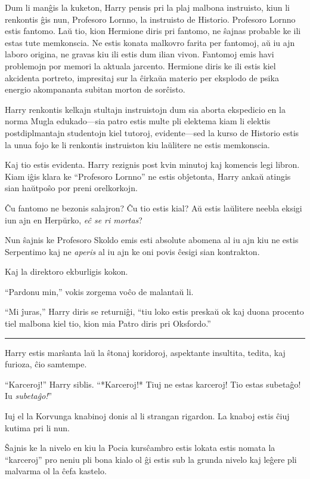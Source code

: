 Dum li manĝis la kuketon, Harry pensis pri la plaj malbona instruisto,
kiun li renkontis ĝis nun, Profesoro Lornno, la instruisto de
Historio. Profesoro Lornno estis fantomo. Laŭ tio, kion Hermione diris
pri fantomo, ne ŝajnas probable ke ili estas tute memkonscia. Ne estis
konata malkovro farita per fantomoj, aŭ iu ajn laboro origina, ne
gravas kiu ili estis dum ilian vivon. Fantomoj emis havi problemojn
por memori la aktuala jarcento. Hermione diris ke ili estis kiel
akcidenta portreto, impresitaj sur la ĉirkaŭa materio per eksplodo de
psika energio akompananta subitan morton de sorĉisto.

Harry renkontis kelkajn stultajn instruistojn dum sia aborta
ekspedicio en la norma Mugla edukado—sia patro estis multe pli
elektema kiam li elektis postdiplmantajn studentojn kiel tutoroj,
evidente—sed la kurso de Historio estis la unua fojo ke li renkontis
instruiston kiu laŭlitere ne estis memkonscia.

Kaj tio estis evidenta. Harry rezignis post kvin minutoj kaj komencis
legi libron. Kiam iĝis klara ke ``Profesoro Lornno'' ne estis
obĵetonta, Harry ankaŭ atingis sian haŭtpoŝo por preni orelkorkojn.

Ĉu fantomo ne bezonis salajron? Ĉu tio estis kial? Aŭ estis laŭlitere
neebla eksigi iun ajn en Herpŭrko, \emph{eĉ se ri mortas}?

Nun ŝajnis ke Profesoro Skoldo emis esti absolute abomena al iu ajn
kiu ne estis Serpentimo kaj ne \emph{aperis} al iu ajn ke oni povis
ĉesigi sian kontrakton.

Kaj la direktoro ekburligis kokon.

``Pardonu min,'' vokis zorgema voĉo de malantaŭ li.

``Mi ĵuras,'' Harry diris se returniĝi, ``tiu loko estis preskaŭ ok
kaj duona procento tiel malbona kiel tio, kion mia Patro diris pri
Oksfordo.''

\begin{center}\rule{3in}{0.4pt}\end{center}

Harry estis marŝanta laŭ la ŝtonaj koridoroj, aspektante insultita,
tedita, kaj furioza, ĉio samtempe.

``Karceroj!'' Harry siblis. ``*Karceroj!* Tiuj ne estas karceroj! Tio
estas subetaĝo! Iu \emph{subetaĝo!}''

Iuj el la Korvunga knabinoj donis al li strangan rigardon. La knaboj
estis ĉiuj kutima pri li nun.

Ŝajnis ke la nivelo en kiu la Pocia kursĉambro estis lokata estis
nomata la ``karceroj'' pro neniu pli bona kialo ol ĝi estis sub la
grunda nivelo kaj leĝere pli malvarma ol la ĉefa kastelo.

